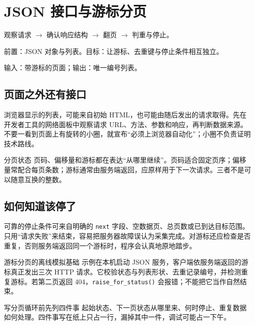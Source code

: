 \chapter{JSON 接口与游标分页}\label{ch:api}
\begin{tcolorbox}[title=章首知识地图,colframe=Ink]
观察请求 $\longrightarrow$ 确认响应结构 $\longrightarrow$ 翻页 $\longrightarrow$ 判重与停止。
\end{tcolorbox}

\begin{tcolorbox}[title=学习目标与前置知识,colframe=Ink!65,colback=Ink!2]
前置：JSON 对象与列表。目标：让游标、去重键与停止条件相互独立。\par
输入：带游标的页面；输出：唯一编号列表。
\end{tcolorbox}

\section{页面之外还有接口}
浏览器显示的列表，可能来自初始 HTML，也可能由随后发出的请求取得。先在开发者工具的网络面板中观察请求 URL、方法、参数和响应，再判断数据来源。不要一看到页面上有旋转的小圈，就宣布“必须上浏览器自动化”；小圈不负责证明技术路线。

\begin{definition}{分页状态}
页码、偏移量和游标都在表达“从哪里继续”。页码适合固定页序；偏移量常配合每页条数；游标通常由服务端返回，应原样用于下一次请求。三者不是可以随意互换的整数。
\end{definition}

\section{如何知道该停了}
可靠的停止条件可来自明确的 \texttt{next} 字段、空数据页、总页数或已到达目标范围。只用“请求失败”来结束，容易把服务器故障误认为采集完成。对游标还应检查是否重复，否则服务端返回同一个游标时，程序会认真地原地踏步。

\begin{example}{游标分页的离线模拟}{基础}
示例在本机启动 JSON 服务，客户端依服务端返回的游标真正发出三次 HTTP 请求。它校验状态与列表形状、去重记录编号，并检测重复游标。若第二页返回 404，\texttt{raise\_for\_status()} 会报错；不能把它当作自然结束。
\par\medskip
{}
\end{example}

\begin{method}{写分页循环前先列四件事}
起始状态、下一页状态从哪里来、何时停止、重复数据如何处理。四件事写在纸上只占一行，漏掉其中一件，调试可能占一下午。
\end{method}

